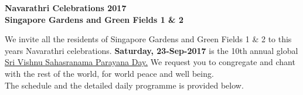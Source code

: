 \documentclass[12pt]{article}
\begin{document}
\pagestyle{empty}
\begin{center}
\textbf{Navarathri Celebrations 2017\\Singapore Gardens and Green Fields 1 \& 2}\\
\end{center}
We invite all the residents of Singapore Gardens and Green Fields 1 \& 2 to this year\textquotesingle s Navarathri celebrations. \textbf{Saturday, 23-Sep-2017} is the 10th annual global  \underline{\textquotesingle Sri Vishnu Sahasranama Parayana Day\textquotesingle .} We request you to congregate and chant with the rest of the world, for world peace and well being. \\The schedule and the detailed daily programme is provided below.
\onehalfspacing
\setlength\extrarowheight{4.5pt}
\end{document}
